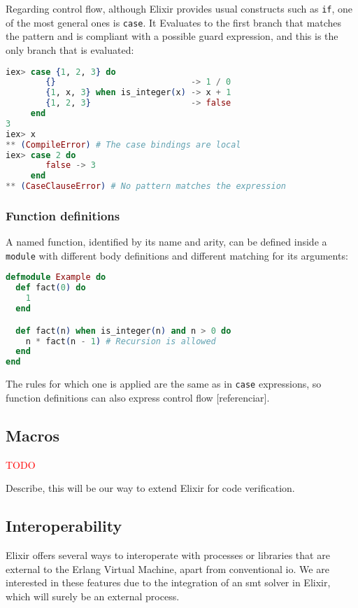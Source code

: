 Regarding control flow, although Elixir provides usual constructs such as 
\verb|if|, one of the most general ones is \verb|case|. It Evaluates to 
the first branch that matches the pattern and is compliant with a possible
guard expression, and this is the only branch that is evaluated:

\begin{lstlisting}[language=elixir,numbers=none,frame=none]
iex> case {1, 2, 3} do 
        {}                           -> 1 / 0
        {1, x, 3} when is_integer(x) -> x + 1
        {1, 2, 3}                    -> false
     end
3
iex> x
** (CompileError) # The case bindings are local
iex> case 2 do 
        false -> 3 
     end 
** (CaseClauseError) # No pattern matches the expression
\end{lstlisting}

\subsubsection{Function definitions}

A named function, identified by its name and arity, can be defined inside 
a \verb|module| with different body definitions and different matching for
its arguments:

\begin{lstlisting}[language=elixir,numbers=none,frame=none]
defmodule Example do 
  def fact(0) do 
    1
  end

  def fact(n) when is_integer(n) and n > 0 do 
    n * fact(n - 1) # Recursion is allowed
  end
end
\end{lstlisting}

The rules for which one is applied are the same as in \verb|case| expressions,
so function definitions can also express control flow [referenciar].

\subsection{Macros}

\textcolor{red}{TODO}

Describe, this will be our way to extend Elixir for code verification.

\subsection{Interoperability}

Elixir offers several ways to interoperate with processes or libraries that are
external to the Erlang Virtual Machine, apart from conventional \gls{io}. We are
interested in these features due to the integration of an \acrshort{smt} solver
in Elixir, which will surely be an external process.

